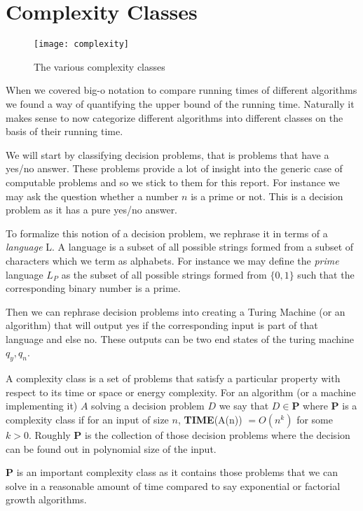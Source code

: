 \section{Complexity Classes}
\begin{figure}[htp]
    \centering
    \caption{The various complexity classes}
    \texttt{[image: complexity]}
\end{figure}
When we covered big-o notation to compare running times of different algorithms we found a way of quantifying the upper bound of the running time. Naturally it makes sense to now categorize different algorithms into different classes on the basis of their running time.

We will start by classifying decision problems, that is problems that have a yes/no answer. These problems provide a lot of insight into the generic case of computable problems and so we stick to them for this report. For instance we may ask the question whether a  number $n$ is a prime or not. This is a decision problem as it has a pure yes/no answer.

To formalize this notion of a decision problem, we rephrase it in terms of a \textit{language} L. A language is a subset of all possible strings formed from a subset of characters which we term as alphabets. For instance we may define the \textit{prime} language $L_P$ as the subset of all possible strings formed from $\{0, 1\}$ such that the corresponding binary number is a prime.

Then we can rephrase decision problems into creating a Turing Machine (or an algorithm) that will output yes if the corresponding input is part of that language and else no. These outputs can be two end states of the turing machine $q_y, q_n$.

A complexity class is a set of problems that satisfy a particular property with respect to its time or space or energy complexity.
For an algorithm (or a machine implementing it) $A$ solving a decision problem $D$ we say that $D \in \textbf{P}$ where \textbf{P} is a complexity class if for an input of size $n$, \textbf{TIME}(A(n)) $ = O(n^k)$ for some $k>0$.
Roughly $\textbf{P}$ is the collection of those decision problems where the decision can be found out in polynomial size of the input.

\textbf{P} is an important complexity class as it contains those problems that we can solve in a reasonable amount of time compared to say exponential or factorial growth algorithms. 

